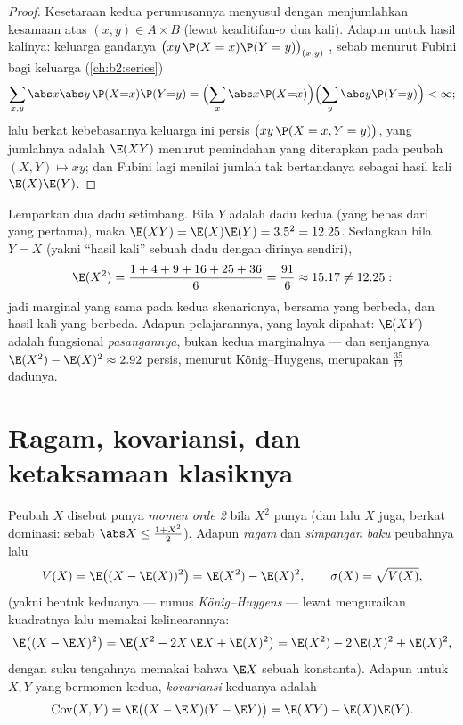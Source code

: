 \begin{proof}
Kesetaraan kedua perumusannya menyusul dengan menjumlahkan
kesamaan  atas $(x, y) \in A \times B$
(lewat keaditifan-$\sigma$ dua kali). Adapun untuk hasil kalinya: keluarga
gandanya $\bigl(xy\,\P(X = x)\P(Y = y)\bigr)_{(x,y)}$ , sebab menurut
Fubini bagi keluarga (\cref{ch:b2:series})
\[
\sum_{x, y}\abs x \abs y\,\P(X{=}x)\P(Y{=}y)
= \Bigl(\sum_x \abs x \P(X{=}x)\Bigr)
\Bigl(\sum_y \abs y \P(Y{=}y)\Bigr) < \infty ;
\]
lalu berkat kebebasannya keluarga ini persis $\bigl(xy\,\P(X = x, Y =
y)\bigr)$, yang jumlahnya adalah $\E(XY)$ menurut pemindahan yang diterapkan pada
peubah $(X, Y) \mapsto xy$; dan Fubini lagi menilai jumlah tak
bertandanya sebagai hasil kali $\E(X)\E(Y)$.
\end{proof}

\begin{example}\label{ex:b2:randomvar:productcontrast}
Lemparkan dua dadu setimbang. Bila $Y$ adalah dadu kedua (yang bebas dari
yang pertama), maka $\E(XY) = \E(X)\E(Y) = 3.5^2 = 12.25$. Sedangkan bila
$Y = X$ (yakni ``hasil kali'' sebuah dadu dengan dirinya sendiri),
\[
\E(X^2) = \frac{1 + 4 + 9 + 16 + 25 + 36}{6} = \frac{91}{6}
\approx 15.17 \neq 12.25 :
\]
jadi  marginal yang sama pada kedua skenarionya,  bersama yang berbeda,
dan  hasil kali yang berbeda. Adapun pelajarannya, yang layak dipahat:
$\E(XY)$ adalah fungsional \emph{pasangannya}, bukan kedua
marginalnya --- dan senjangnya $\E(X^2) - \E(X)^2 \approx 2.92$
persis, menurut König--Huygens, merupakan 
$\frac{35}{12}$ dadunya.
\end{example}

\section{Ragam, kovariansi, dan ketaksamaan klasiknya}

\begin{definition}\label{def:b2:randomvar:variance}
Peubah $X$ disebut punya \emph{momen orde 2} bila $X^2$ punya 
(dan lalu $X$ juga, berkat dominasi: sebab $\abs X \leq \frac{1 +
X^2}{2}$). Adapun \emph{ragam} dan \emph{simpangan
baku} peubahnya lalu
\[
V(X) = \E\bigl((X - \E(X))^2\bigr)
= \E(X^2) - \E(X)^2 ,
\qquad
\sigma(X) = \sqrt{V(X)} ,
\]
(yakni bentuk keduanya --- rumus \emph{König--Huygens} --- lewat
menguraikan kuadratnya lalu memakai kelinearannya:
\[
\E\bigl((X - \E X)^2\bigr)
= \E\bigl(X^2 - 2X\,\E X + \E(X)^2\bigr)
= \E(X^2) - 2\,\E(X)^2 + \E(X)^2 ,
\]
dengan suku tengahnya memakai bahwa $\E X$ sebuah konstanta). Adapun untuk $X, Y$ yang bermomen kedua,
\emph{kovariansi} keduanya adalah
\[
\operatorname{Cov}(X, Y)
= \E\bigl((X - \E X)(Y - \E Y)\bigr)
= \E(XY) - \E(X)\E(Y) .
\]
\end{definition}

